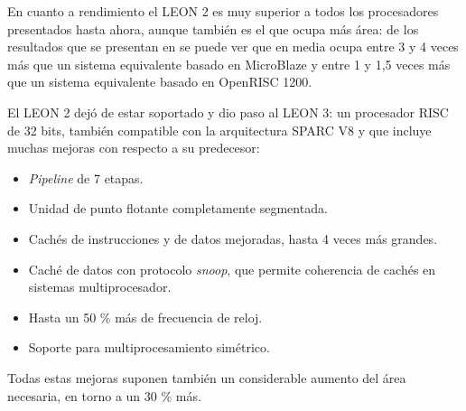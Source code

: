 En cuanto a rendimiento el LEON 2 es muy superior a todos los procesadores presentados hasta ahora, aunque también es el que ocupa más área: de los resultados que se presentan en \cite{Etiqueta32} se puede ver que en media ocupa entre 3 y 4 veces más que un sistema equivalente basado en MicroBlaze y entre 1 y 1,5 veces más que un sistema equivalente basado en OpenRISC 1200. 

El LEON 2 dejó de estar soportado y dio paso al LEON 3: un procesador RISC de 32 bits, también compatible con la arquitectura SPARC V8 y que incluye muchas mejoras con respecto a su predecesor:

\begin{itemize}
		 
	       \item \textit{Pipeline} de 7 etapas.
		 \item Unidad de punto flotante completamente segmentada.
		 \item Cachés de instrucciones y de datos mejoradas, hasta 4 veces más grandes.
 		\item  Caché de datos con protocolo \textit{snoop}, que permite coherencia de cachés en sistemas multiprocesador.
		\item Hasta un 50 \% más de frecuencia de reloj.
		\item Soporte para multiprocesamiento simétrico.
		\end{itemize}
   
Todas estas mejoras suponen también un considerable aumento del área necesaria, en torno a un 30 \% más.

